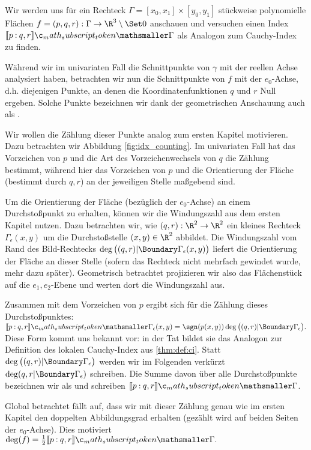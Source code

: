 \documentclass{mythesis}
\begin{document}
Wir werden uns für ein Rechteck $\Gamma = [x_0,x_1] \times [y_0,y_1]$ stückweise polynomielle Flächen $f = (p,q,r): \Gamma \to \R^3 \setminus \Set 0$ anschauen und versuchen einen Index $\Index{\Gamma}{p}{q,r}$ als Analogon zum Cauchy-Index zu finden.

Während wir im univariaten Fall die Schnittpunkte von $\gamma$ mit der reellen Achse analysiert haben, betrachten wir nun die Schnittpunkte von $f$ mit der $e_0$-Achse, d.h. diejenigen Punkte, an denen die Koordinatenfunktionen $q$ und $r$ Null ergeben.
Solche Punkte bezeichnen wir dank der geometrischen Anschauung auch als .

Wir wollen die Zählung dieser Punkte analog zum ersten Kapitel motivieren.
Dazu betrachten wir Abbildung \ref{fig:idx_counting}.
Im univariaten Fall hat das Vorzeichen von $p$ und die Art des Vorzeichenwechsels von $q$ die Zählung bestimmt, während hier das Vorzeichen von $p$ und die Orientierung der Fläche (bestimmt durch $q, r$) an der jeweiligen Stelle maßgebend sind.

Um die Orientierung der Fläche (bezüglich der $e_0$-Achse) an einem Durchstoßpunkt zu erhalten, können wir die Windungszahl aus dem ersten Kapitel nutzen.
Dazu betrachten wir, wie $(q, r): \R^2 \to \R^2$ ein kleines Rechteck $\Gamma_\epsilon(x,y)$ um die Durchstoßstelle $(x,y) \in \R^2$ abbildet.
Die Windungszahl vom Rand des Bild-Rechtecks $\deg\big((q,r)|\Boundary\Gamma_\epsilon(x,y)\big)$ liefert die Orientierung der Fläche an dieser Stelle (sofern das Rechteck nicht mehrfach gewindet wurde, mehr dazu später).
Geometrisch betrachtet projizieren wir also das Flächenstück auf die $e_1,e_2$-Ebene und werten dort die Windungszahl aus.

Zusammen mit dem Vorzeichen von $p$ ergibt sich für die Zählung dieses Durchstoßpunktes:
\begin{math}
    \Index{\Gamma_\epsilon(x,y)}{p}{q,r}
    = \sgn(p(x,y)) \deg\big((q,r)|\Boundary\Gamma_\epsilon\big).
\end{math}
Diese Form kommt uns bekannt vor: in der Tat bildet sie das Analogon zur Definition des lokalen Cauchy-Index aus \ref{thm:def:ci}.
Statt $\deg\big((q,r)|\Boundary\Gamma_\epsilon\big)$ werden wir im Folgenden verkürzt $\deg(q,r|\Boundary\Gamma_\epsilon)$ schreiben.
Die Summe davon über alle Durchstoßpunkte bezeichnen wir als  und schreiben $\Index{\Gamma}{p}{q,r}$.

Global betrachtet fällt auf, dass wir mit dieser Zählung genau wie im ersten Kapitel den doppelten Abbildungsgrad erhalten (gezählt wird auf beiden Seiten der $e_0$-Achse).
Dies motiviert
\begin{math}
    \deg(f) = \frac{1}{2} \Index{\Gamma}{p}{q,r}.
\end{math}
\end{document}
